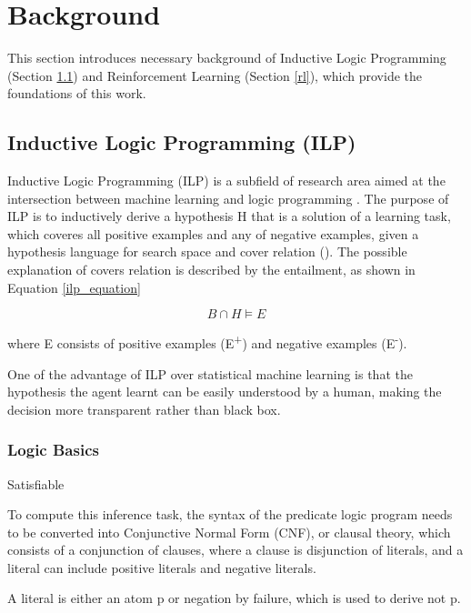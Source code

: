 \documentclass[12pt,twoside]{report}
\begin{document}
\chapter{Background}
\label{background}

This section introduces necessary background of Inductive Logic Programming (Section \ref{ilp}) and Reinforcement Learning (Section \ref{rl}), which provide the foundations of this work.

\section{Inductive Logic Programming (ILP)}
\label{ilp}


Inductive Logic Programming (ILP) is a subfield of research area aimed at the intersection between machine learning and logic programming \cite{Muggleton1991}. The purpose of ILP is to inductively derive a hypothesis H that is a solution of a learning task, which coveres all positive examples and any of negative examples, given a hypothesis language for search space and cover relation (\cite{DeRaedt1997}). The possible explanation of covers relation is described by the entailment, as shown in Equation \ref{ilp_equation}

\begin{equation}
B \cap H \models E
\end{equation}
\label{ilp_equation}

where E consists of positive examples (E\textsuperscript{+}) and negative examples (E\textsuperscript{-}). 

One of the advantage of ILP over statistical machine learning is that the hypothesis the agent learnt can be easily understood by a human, making the decision more transparent rather than black box.

\subsection{Logic Basics}

Satisfiable

To compute this inference task, the syntax of the predicate logic program needs to be converted into Conjunctive Normal Form (CNF), or clausal theory, which consists of a conjunction of clauses, where a clause is disjunction of literals, and a literal can include positive literals and negative literals.

A literal is either an atom p or negation by failure, which is used to derive not p.
\end{document}
